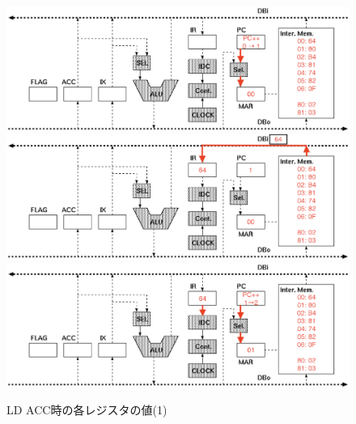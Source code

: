 \documentclass[dvipdfmx]{jsarticle}
\begin{document}
\begin{figure}[H] %
    \begin{center}
        \includegraphics[scale=0.7]{img/ld0.eps}%
        \vspace{-2mm}
        \label{img:ld0}
    \vspace{1cm}
        \includegraphics[scale=0.7]{img/ld1.eps}%
        \vspace{-2mm}
        \label{img:ld1}
    \vspace{1cm}
        \includegraphics[scale=0.7]{img/ld2.eps}%
        \vspace{-2mm}
        \label{img:ld2}
    \vspace{1cm}
    \end{center}
    \caption{LD ACC時の各レジスタの値(1)}
    \label{ld1}
\end{figure}
\end{document}
